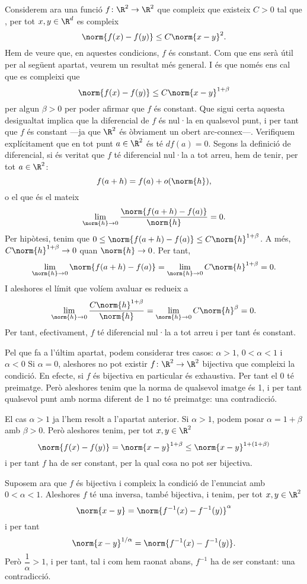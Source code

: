 \documentclass[12pt]{article}
\begin{document}
\bigskip
Considerem ara una funció \( f \colon \R^2 \to \R^2 \) que compleix que existeix \( C > 0 \) tal que , per tot \( x, y \in \R^d \) es compleix
\[ \norm{f(x) - f(y)} \leq C\norm{x - y}^2. \]
Hem de veure que, en aquestes condicions, \( f \) és constant. Com que ens serà útil per al següent apartat, veurem un resultat més general. I és que només ens cal que es compleixi que 
\[ \norm{f(x) - f(y)} \leq C\norm{x - y}^{1 + \beta} \]
per algun \( \beta > 0 \) per poder afirmar que \( f \) és constant. Que sigui certa aquesta desigualtat implica que la diferencial de \( f \) és nul·la en qualsevol punt, i per tant que \( f \) és constant ---ja que \( \R^2 \) és òbviament un obert arc-connex---. Verifiquem explícitament que en tot punt \( a \in \R^2 \) és té \( df(a) = 0 \). Segons la definició de diferencial, si és veritat que \( f \) té diferencial nul·la a tot arreu, hem de tenir, per tot \( a \in \R^2 \):
\begin{equation*}
  f(a + h) = f(a) + o(\norm{h}),
\end{equation*}
o el que és el mateix
\begin{equation*}
  \lim_{\norm{h} \to 0}{\dfrac{\norm{f(a+h) - f(a)}}{\norm{h}}} = 0.
\end{equation*}
Per hipòtesi, tenim que \( 0 \leq \norm{f(a + h) -f(a)} \leq C \norm{h}^{1 + \beta} \). A més, \( C \norm{h}^{1+\beta} \to 0 \) quan \( \norm{h} \to 0 \). Per tant,
\[ \lim_{\norm{h} \to 0}{\norm{f(a + h) - f(a)}} = \lim_{\norm{h} \to 0}{C \norm{h}^{1 + \beta}} = 0. \]
I aleshores el límit que volíem avaluar es redueix a
\[ \lim_{\norm{h} \to 0}{\dfrac{C \norm{h}^{1 + \beta}}{\norm{h}}} = \lim_{\norm{h} \to 0}{C \norm{h}^{\beta}} = 0. \]
Per tant, efectivament, \( f \) té diferencial nul·la a tot arreu i per tant és constant.

\bigskip
Pel que fa a l'últim apartat, podem considerar tres casos: \( \alpha > 1 \), \( 0 < \alpha < 1 \) i \( \alpha < 0 \)
Si \( \alpha = 0 \), aleshores no pot existir \( f \colon \R^2 \to \R^2 \) bijectiva que compleixi la condició. En efecte, si \( f \) és bijectiva en particular és exhaustiva. Per tant el 0 té preimatge. Però aleshores tenim que la norma de qualsevol imatge és 1, i per tant qualsevol punt amb norma diferent de 1 no té preimatge: una contradicció.

El cas \( \alpha > 1 \) ja l'hem resolt a l'apartat anterior. Si \( \alpha > 1 \), podem posar \( \alpha = 1 + \beta \) amb \( \beta > 0 \). Però aleshores tenim, per tot \( x, y \in \R^2 \)
\[ \norm{f(x) - f(y)} = \norm{x - y}^{1 + \beta} \leq \norm{x - y}^{1 + (1+\beta)} \]
i per tant \( f \) ha de ser constant, per la qual cosa no pot ser bijectiva. 

Suposem ara que \( f \) és bijectiva i compleix la condició de l'enunciat amb \( 0 < \alpha < 1 \). Aleshores \( f \) té una inversa, també bijectiva, i tenim, per tot \( x, y \in \R^2 \)
\[ \norm{x - y} = \norm{f^{-1}(x) - f^{-1}(y)}^{\alpha} \]
i per tant
\[ \norm{x - y}^{1 / \alpha} = \norm{f^{-1}(x) - f^{-1}(y)}. \]
Però \( \dfrac{1}{\alpha} > 1 \), i per tant, tal i com hem raonat abans, \( f^{-1} \) ha de ser constant: una contradicció.
\end{document}

